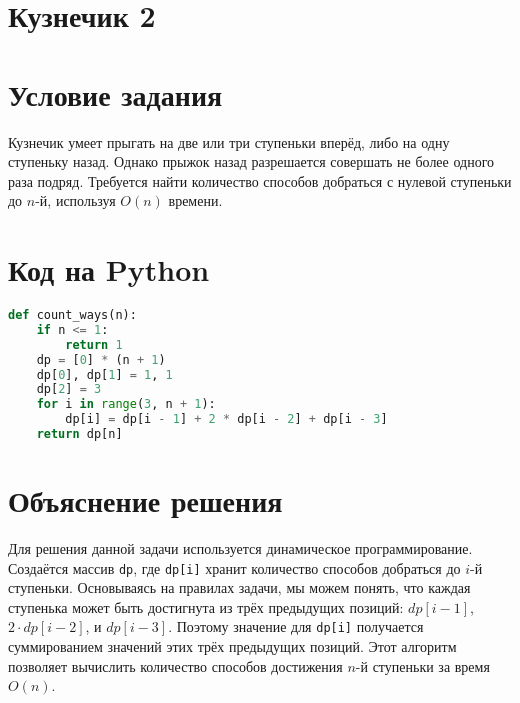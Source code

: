 \section*{Кузнечик 2}


\section*{Условие задания}

Кузнечик умеет прыгать на две или три ступеньки вперёд, либо на одну ступеньку назад. Однако прыжок назад разрешается совершать не более одного раза подряд. Требуется найти количество способов добраться с нулевой ступеньки до \(n\)-й, используя \(O(n)\) времени.

\section*{Код на Python}

\begin{lstlisting}[language=Python]
def count_ways(n):
    if n <= 1:
        return 1
    dp = [0] * (n + 1)
    dp[0], dp[1] = 1, 1
    dp[2] = 3
    for i in range(3, n + 1):
        dp[i] = dp[i - 1] + 2 * dp[i - 2] + dp[i - 3]
    return dp[n]
\end{lstlisting}

\section*{Объяснение решения}

Для решения данной задачи используется динамическое программирование. Создаётся массив \texttt{dp}, где \texttt{dp[i]} хранит количество способов добраться до \(i\)-й ступеньки. Основываясь на правилах задачи, мы можем понять, что каждая ступенька может быть достигнута из трёх предыдущих позиций: \(dp[i-1]\), \(2 \cdot dp[i-2]\), и \(dp[i-3]\). Поэтому значение для \texttt{dp[i]} получается суммированием значений этих трёх предыдущих позиций. Этот алгоритм позволяет вычислить количество способов достижения \(n\)-й ступеньки за время \(O(n)\).
